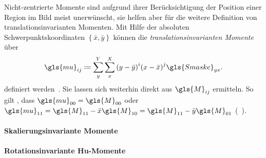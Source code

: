 Nicht-zentrierte Momente sind aufgrund ihrer Berücksichtigung der Position einer Region im Bild meist unerwünscht, sie helfen aber für die weitere Definition von translationsinvarianten Momenten.
Mit Hilfe der absoluten Schwerpunktskoordinaten $\left\{ \bar{x}, \bar{y} \right\}$ können die \emph{translationsinvarianten Momente} über
\begin{equation*}
  \gls{mu}_{ij} \coloneqq \sum_y^Y \sum_x^X {\left(y - \bar{y}\right)}^i {\left(x - \bar{x}\right)}^j \gls{Smaske}_{yx}.
\end{equation*}
definiert werden~\cite{momente}.
Sie lassen sich weiterhin direkt aus $\gls{M}_{ij}$ ermitteln.
So gilt \zB{}, dass $\gls{mu}_{00} = \gls{M}_{00}$ oder $\gls{mu}_{11} = \gls{M}_{11} - \bar{x}\gls{M}_{10} = \gls{M}_{11} - \bar{y}\gls{M}_{01}$ (\vgl{}~\cite{momente}).


\paragraph{Skalierungsinvariante Momente}
\label{skalierungsinvariante_zentrierte_momente}

\paragraph{Rotationsinvariante Hu-Momente}
\label{rotationsinvariante_momente}


\cite{Siedhoff}
